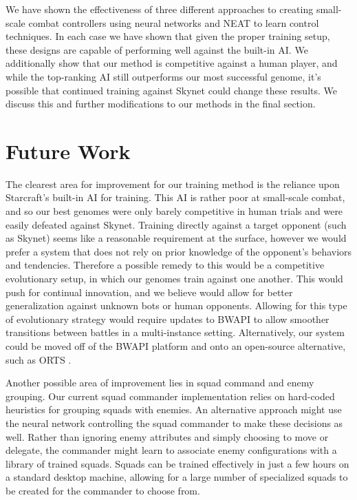 \documentclass[10pt,a4paper,twocolumn]{article}
\begin{document}
We have shown the effectiveness of three different approaches to creating small-scale combat controllers using neural networks and NEAT to learn control techniques. In each case we have shown that given the proper training setup, these designs are capable of performing well against the built-in AI. We additionally show that our method is competitive against a human player, and while the top-ranking AI still outperforms our most successful genome, it's possible that continued training against Skynet could change these results. We discuss this and further modifications to our methods in the final section.

\section{Future Work}
\label{sec:future}

The clearest area for improvement for our training method is the reliance upon Starcraft's built-in AI for training. This AI is rather poor at small-scale combat, and so our best genomes were only barely competitive in human trials and were easily defeated against Skynet. Training directly against a target opponent (such as Skynet) seems like a reasonable requirement at the surface, however we would prefer a system that does not rely on prior knowledge of the opponent's behaviors and tendencies. Therefore a possible remedy to this would be a competitive evolutionary setup, in which our genomes train against one another. This would push for continual innovation, and we believe would allow for better generalization against unknown bots or human opponents. Allowing for this type of evolutionary strategy would require updates to BWAPI to allow smoother transitions between battles in a multi-instance setting. Alternatively, our system could be moved off of the BWAPI platform and onto an open-source alternative, such as ORTS \cite{orts}.

Another possible area of improvement lies in squad command and enemy grouping. Our current squad commander implementation relies on hard-coded heuristics for grouping squads with enemies. An alternative approach might use the neural network controlling the squad commander to make these decisions as well. Rather than ignoring enemy attributes and simply choosing to move or delegate, the commander might learn to associate enemy configurations with a library of trained squads. Squads can be trained effectively in just a few hours on a standard desktop machine, allowing for a large number of specialized squads to be created for the commander to choose from.
\end{document}
